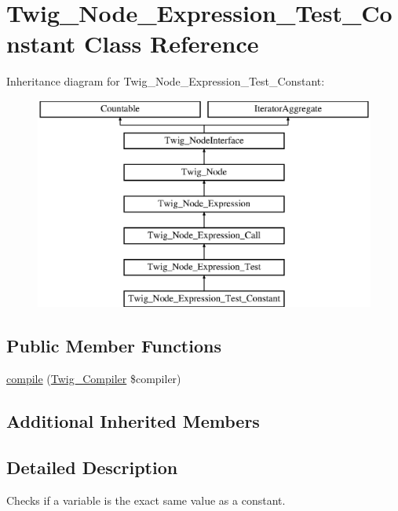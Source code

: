 \hypertarget{classTwig__Node__Expression__Test__Constant}{}\section{Twig\+\_\+\+Node\+\_\+\+Expression\+\_\+\+Test\+\_\+\+Constant Class Reference}
\label{classTwig__Node__Expression__Test__Constant}
Inheritance diagram for Twig\+\_\+\+Node\+\_\+\+Expression\+\_\+\+Test\+\_\+\+Constant\+:\begin{figure}[H]
\begin{center}
\leavevmode
\includegraphics[height=7.000000cm]{classTwig__Node__Expression__Test__Constant}
\end{center}
\end{figure}
\subsection*{Public Member Functions}
\begin{DoxyCompactItemize}
\item 
\hyperlink{classTwig__Node__Expression__Test__Constant_af3c6258c4ebeed2ee4c01a6fa6871d5d}{compile} (\hyperlink{classTwig__Compiler}{Twig\+\_\+\+Compiler} \$compiler)
\end{DoxyCompactItemize}
\subsection*{Additional Inherited Members}


\subsection{Detailed Description}
Checks if a variable is the exact same value as a constant.


